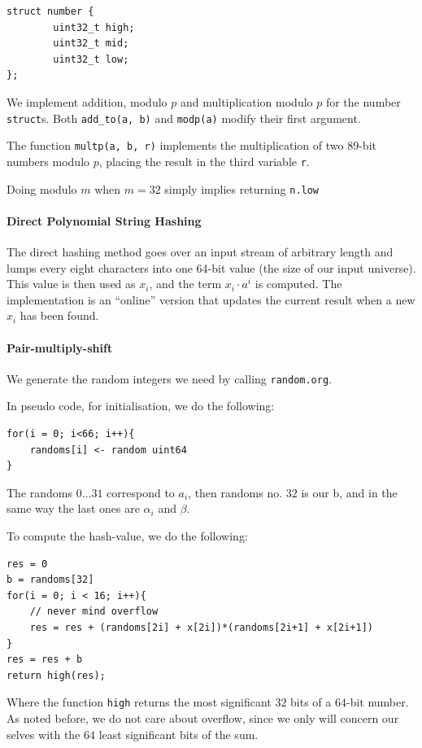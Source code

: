 \documentclass[]{article}
\newcommand{\funk}[1]{\small\texttt{#1}}
\begin{document}
\begin{verbatim}
struct number {
        uint32_t high;
        uint32_t mid;
        uint32_t low;
};
\end{verbatim}

We implement addition, modulo $p$ and multiplication modulo $p$ for the number \funk{struct}s. Both \funk{add\_to(a, b)} and \funk{modp(a)} modify their first argument.

The function \funk{multp(a, b, r)} implements the multiplication of two 89-bit numbers modulo $p$, placing the result in the third variable \funk{r}.

Doing modulo $m$ when $m = 32$ simply implies returning \funk{n.low}

\paragraph{Direct Polynomial String Hashing}

The direct hashing method goes over an input stream of arbitrary length and lumps every eight characters into one 64-bit value (the size of our input universe). This value is then used as $x_i$, and the term $x_i\cdot a^i$ is computed. The implementation is an ``online'' version that updates the current result when a new $x_i$ has been found.
\paragraph{Pair-multiply-shift} 

We generate the random integers we need by calling \texttt{random.org}. 

In pseudo code, for initialisation, we do the following:

\begin{verbatim}
for(i = 0; i<66; i++){
    randoms[i] <- random uint64
}
\end{verbatim}

The randoms $0\ldots 31$ correspond to $a_i$, then randoms no. $32$ is our b, and in the same way the last ones are $\alpha_i$ and $\beta$.

To compute the hash-value, we do the following:
\begin{verbatim}
res = 0
b = randoms[32]
for(i = 0; i < 16; i++){
    // never mind overflow
    res = res + (randoms[2i] + x[2i])*(randoms[2i+1] + x[2i+1])
}
res = res + b
return high(res);
\end{verbatim}

Where the function \texttt{high} returns the most significant $32$ bits of a $64$-bit number.
As noted before, we do not care about overflow, since we only will concern our selves with the $64$ least significant bits of the sum.
\end{document}
